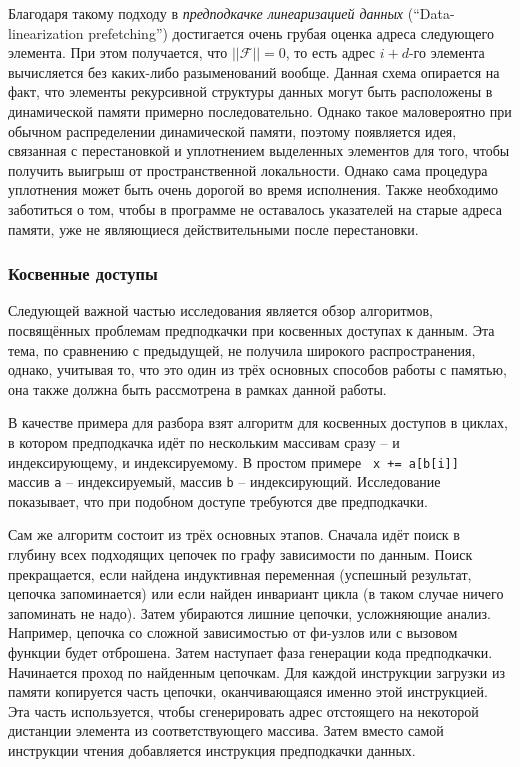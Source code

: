 \documentclass[12pt,a4paper,oneside]{article}
\begin{document}
Благодаря такому подходу в \emph{предподкачке линеаризацией данных} (``Data-linearization prefetching'') достигается очень грубая оценка адреса следующего элемента. При этом получается, что $||\mathcal{F}|| = 0$, то есть адрес $i+d$-го элемента вычисляется без каких-либо разыменований вообще. Данная схема опирается на факт, что элементы рекурсивной структуры данных могут быть расположены в динамической памяти примерно последовательно. Однако такое маловероятно при обычном распределении динамической памяти, поэтому появляется идея, связанная с перестановкой и уплотнением выделенных элементов для того, чтобы получить выигрыш от пространственной локальности. Однако сама процедура уплотнения может быть очень дорогой во время исполнения. Также необходимо заботиться о том, чтобы в программе не оставалось указателей на старые адреса памяти, уже не являющиеся действительными после перестановки.

\subsubsection{Косвенные доступы}

\indent

Следующей важной частью исследования является обзор алгоритмов, посвящённых проблемам предподкачки при косвенных доступах к данным. Эта тема, по сравнению с предыдущей, не получила широкого распространения, однако, учитывая то, что это один из трёх основных способов работы с памятью, она также должна быть рассмотрена в рамках данной работы.

В качестве примера для разбора взят алгоритм для косвенных доступов в циклах\cite{AinsworthIA}, в котором предподкачка идёт по нескольким массивам сразу -- и индексирующему, и индексируемому. В простом примере \texttt{ x += a[b[i]] } массив \texttt{a} -- индексируемый, массив \texttt{b} -- индексирующий. Исследование показывает, что при подобном доступе требуются две предподкачки.



Сам же алгоритм состоит из трёх основных этапов. Сначала идёт поиск в глубину всех подходящих цепочек по графу зависимости по данным. Поиск прекращается, если найдена индуктивная переменная (успешный результат, цепочка запоминается) или если найден инвариант цикла (в таком случае ничего запоминать не надо). Затем убираются лишние цепочки, усложняющие анализ. Например, цепочка со сложной зависимостью от фи-узлов или с вызовом функции будет отброшена. Затем наступает фаза генерации кода предподкачки. Начинается проход по найденным цепочкам. Для каждой инструкции загрузки из памяти копируется часть цепочки, оканчивающаяся именно этой инструкцией. Эта часть используется, чтобы сгенерировать адрес отстоящего на некоторой дистанции элемента из соответствующего массива. Затем вместо самой инструкции чтения добавляется инструкция предподкачки данных.
\end{document}
